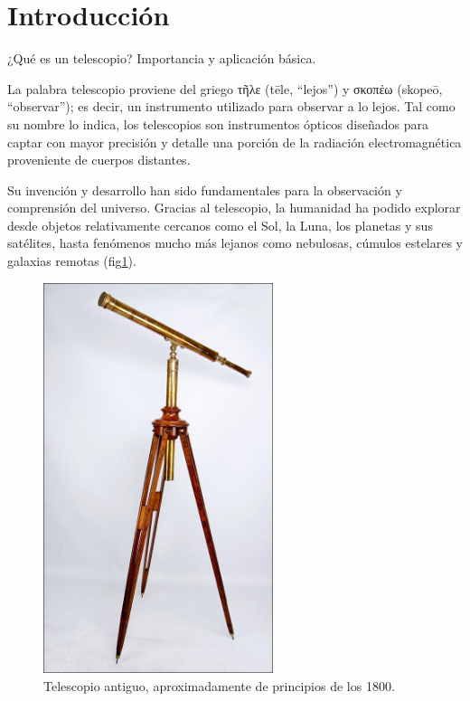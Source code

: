 
\section{Introducción}

¿Qué es un telescopio? Importancia y aplicación básica.

La palabra telescopio proviene del griego \foreignlanguage{greek}{τῆλε} (tēle, “lejos”) y \foreignlanguage{greek}{σκοπέω} (skopeō, “observar”); es decir, un instrumento utilizado para observar a lo lejos. Tal como su nombre lo indica, los telescopios son instrumentos ópticos diseñados para captar con mayor precisión y detalle una porción de la radiación electromagnética proveniente de cuerpos distantes.

Su invención y desarrollo han sido fundamentales para la observación y comprensión del universo. Gracias al telescopio, la humanidad ha podido explorar desde objetos relativamente cercanos como el Sol, la Luna, los planetas y sus satélites, hasta fenómenos mucho más lejanos como nebulosas, cúmulos estelares y galaxias remotas (fig\ref{fig:telescopio_antiguo}).

\begin{figure}[H]
	\centering
	\includegraphics[width=0.6\textwidth]{images/telescopio_antiguo.jpg}
	\caption{Telescopio antiguo, aproximadamente de principios de los 1800.}
	\label{fig:telescopio_antiguo}
\end{figure}

